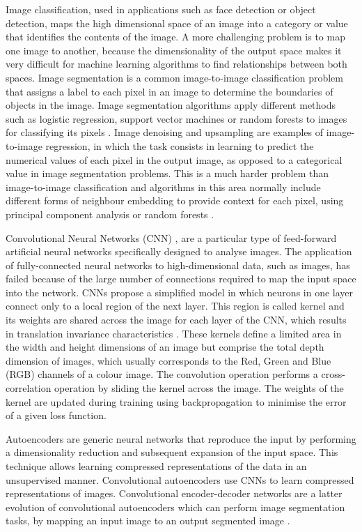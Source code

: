 \documentclass[twocol]{ametsoc}
\begin{document}
Image classification, used in applications such as face detection or object detection, maps the high dimensional space of an image into a category \citep{haralick1973textural} or value \citep{takeda2007kernel} that identifies the contents of the image. A more challenging problem is to map one image to another, because the dimensionality of the output space makes it very difficult for machine learning algorithms to find relationships between both spaces. Image segmentation is a common image-to-image classification problem that assigns a label to each pixel in an image to determine the boundaries of objects in the image. Image segmentation algorithms apply different methods such as logistic regression, support vector machines or random forests to images for classifying its pixels \citep{haralick1985image,pal1993review,pal2005random}. Image denoising and upsampling are examples of image-to-image regression, in which the task consists in learning to predict the numerical values of each pixel in the output image, as opposed to a categorical value in image segmentation problems. This is a much harder problem than image-to-image classification and algorithms in this area normally include different forms of neighbour embedding to provide context for each pixel, using principal component analysis or random forests \citep{chang2004super,schulter2015fast}.

Convolutional Neural Networks (CNN) \citep{lecun2010convolutional}, are a particular type of feed-forward artificial neural networks specifically designed to analyse images. The application of fully-connected neural networks to high-dimensional data, such as images, has failed because of the large number of connections required to map the input space into the network. CNNs propose a simplified model in which neurons in one layer connect only to a local region of the next layer. This region is called kernel and its weights are shared across the image for each layer of the CNN, which results in translation invariance characteristics \citep{scherer2010evaluation}. These kernels define a limited area in the width and height dimensions of an image but comprise the total depth dimension of images, which usually corresponds to the Red, Green and Blue (RGB) channels of a colour image. The convolution operation performs a cross-correlation operation by sliding the kernel across the image. The weights of the kernel are updated during training using backpropagation \citep{widrow199030} to minimise the error of a given loss function. 

Autoencoders \citep{hinton2006reducing} are generic neural networks that reproduce the input by performing a dimensionality reduction and subsequent expansion of the input space. This technique allows learning compressed representations of the data in an unsupervised manner. Convolutional autoencoders \citep{masci2011stacked} use CNNs to learn compressed representations of images. Convolutional encoder-decoder networks are a latter evolution of convolutional autoencoders which can perform image segmentation tasks, by mapping an input image to an output segmented image \citep{long2015fully}.
\end{document}
